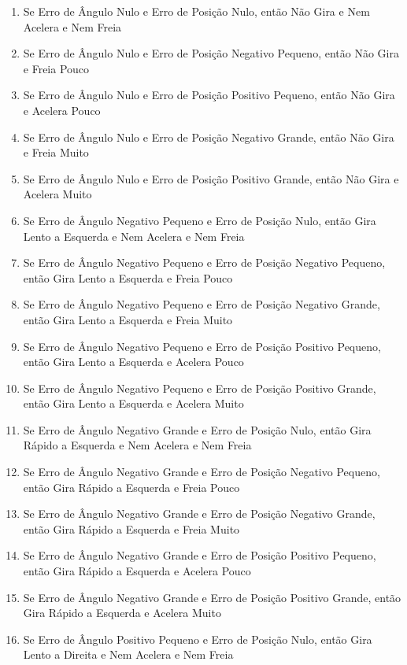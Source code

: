         \begin{enumerate}
            \item Se Erro de Ângulo Nulo e Erro de Posição Nulo, então Não Gira e Nem Acelera e Nem Freia
            \item Se Erro de Ângulo Nulo e Erro de Posição Negativo Pequeno, então Não Gira e Freia Pouco
            \item Se Erro de Ângulo Nulo e Erro de Posição Positivo Pequeno, então Não Gira e Acelera Pouco
            \item Se Erro de Ângulo Nulo e Erro de Posição Negativo Grande, então Não Gira e Freia Muito
            \item Se Erro de Ângulo Nulo e Erro de Posição Positivo Grande, então Não Gira e Acelera Muito
            \item Se Erro de Ângulo Negativo Pequeno e Erro de Posição Nulo, então Gira Lento a Esquerda e Nem Acelera e Nem Freia
            \item Se Erro de Ângulo Negativo Pequeno e Erro de Posição Negativo Pequeno, então Gira Lento a Esquerda e Freia Pouco
            \item Se Erro de Ângulo Negativo Pequeno e Erro de Posição Negativo Grande, então Gira Lento a Esquerda e Freia Muito
            \item Se Erro de Ângulo Negativo Pequeno e Erro de Posição Positivo Pequeno, então Gira Lento a Esquerda e Acelera Pouco
            \item Se Erro de Ângulo Negativo Pequeno e Erro de Posição Positivo Grande, então Gira Lento a Esquerda e Acelera Muito
            \item Se Erro de Ângulo Negativo Grande e Erro de Posição Nulo, então Gira Rápido a Esquerda e Nem Acelera e Nem Freia
            \item Se Erro de Ângulo Negativo Grande e Erro de Posição Negativo Pequeno, então Gira Rápido a Esquerda e Freia Pouco
            \item Se Erro de Ângulo Negativo Grande e Erro de Posição Negativo Grande, então Gira Rápido a Esquerda e Freia Muito
            \item Se Erro de Ângulo Negativo Grande e Erro de Posição Positivo Pequeno, então Gira Rápido a Esquerda e Acelera Pouco
            \item Se Erro de Ângulo Negativo Grande e Erro de Posição Positivo Grande, então Gira Rápido a Esquerda e Acelera Muito
            \item Se Erro de Ângulo Positivo Pequeno e Erro de Posição Nulo, então Gira Lento a Direita e Nem Acelera e Nem Freia

\end{enumerate}
